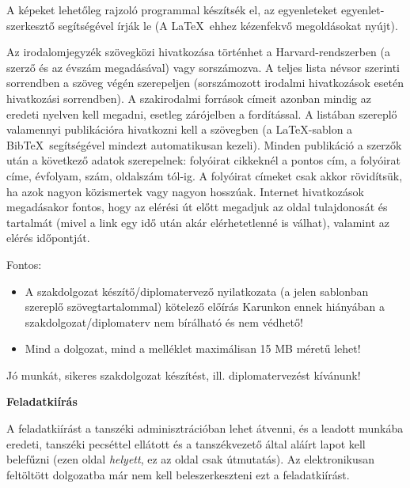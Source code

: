 \documentclass[11pt,magyar,a4paper,oneside,]{report}
\begin{document}
A képeket lehetőleg rajzoló programmal készítsék el, az egyenleteket
egyenlet-szerkesztő segítségével írják le (A \LaTeX~ehhez kézenfekvő
megoldásokat nyújt).

Az irodalomjegyzék szövegközi hivatkozása történhet a
Harvard-rendszerben (a szerző és az évszám megadásával) vagy
sorszámozva. A teljes lista névsor szerinti sorrendben a szöveg végén
szerepeljen (sorszámozott irodalmi hivatkozások esetén hivatkozási
sorrendben). A szakirodalmi források címeit azonban mindig az eredeti
nyelven kell megadni, esetleg zárójelben a fordítással. A listában
szereplő valamennyi publikációra hivatkozni kell a szövegben (a
\LaTeX-sablon a Bib\TeX~segítségével mindezt automatikusan kezeli).
Minden publikáció a szerzők után a következő adatok szerepelnek:
folyóirat cikkeknél a pontos cím, a folyóirat címe, évfolyam, szám,
oldalszám tól-ig. A folyóirat címeket csak akkor rövidítsük, ha azok
nagyon közismertek vagy nagyon hosszúak. Internet hivatkozások
megadásakor fontos, hogy az elérési út előtt megadjuk az oldal
tulajdonosát és tartalmát (mivel a link egy idő után akár elérhetetlenné
is válhat), valamint az elérés időpontját.

Fontos:

\begin{itemize}
\itemsep1pt\parskip0pt
\item
  A szakdolgozat készítő/diplomatervező nyilatkozata (a jelen sablonban
  szereplő szövegtartalommal) kötelező előírás Karunkon ennek hiányában
  a szakdolgozat/diplomaterv nem bírálható és nem védhető!
\item
  Mind a dolgozat, mind a melléklet maximálisan 15 MB méretű lehet!
\end{itemize}

Jó munkát, sikeres szakdolgozat készítést, ill. diplomatervezést
kívánunk!

\clearpage

\textbf{Feladatkiírás}

A feladatkiírást a tanszéki adminisztrációban lehet átvenni, és a
leadott munkába eredeti, tanszéki pecséttel ellátott és a tanszékvezető
által aláírt lapot kell belefűzni (ezen oldal \emph{helyett}, ez az
oldal csak útmutatás). Az elektronikusan feltöltött dolgozatba már nem
kell beleszerkeszteni ezt a feladatkiírást.


\normalsize
\end{document}
